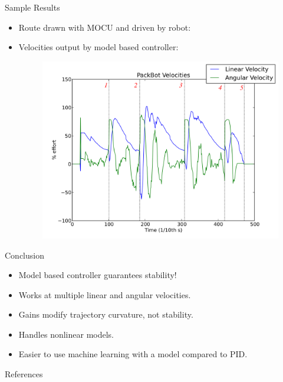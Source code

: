 \documentclass[hyperref={pdfpagelabels=false}]{beamer}
\begin{document}
\begin{frame}{Sample Results}
\begin{itemize}
\item Route drawn with MOCU and driven by robot:
\begin{figure}[ht!]
	\centering
    \quad
\end{figure}
\item Velocities output by model based controller:
\begin{figure}[ht!]
	\centering
	\includegraphics[width=.5\textwidth]{images/20100918_1717_velocities}
\end{figure}
\end{itemize}
\end{frame}

\begin{frame}{Conclusion}
\begin{itemize}
\item Model based controller guarantees stability!
\item Works at multiple linear and angular velocities.
\item Gains modify trajectory curvature, not stability.
\item Handles nonlinear models.
\item Easier to use machine learning with a model compared to PID.
\end{itemize}
\end{frame}

\begin{frame}[allowframebreaks]{References}
\nocite{Khalil02}
\nocite{Rusu05RobotuxLyapunov}
\nocite{Aicardi_UnicycleLyapunov95}
\nocite{Lapierre07}
\nocite{Sights07}
\nocite{ZeiglerNichols42}


\end{frame}
\end{document}
